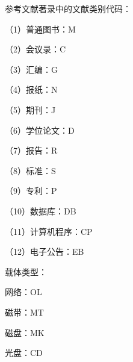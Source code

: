 \par
参考文献著录中的文献类别代码：
\par
（1）普通图书：M
\par
（2）会议录：C
\par
（3）汇编：G
\par
（4）报纸：N
\par
（5）期刊：J
\par
（6）学位论文：D
\par
（7）报告：R
\par
（8）标准：S
\par
（9）专利：P
\par
（10）数据库：DB
\par
（11）计算机程序：CP
\par
（12）电子公告：EB
\par
载体类型：
\par
网络：OL
\par
磁带：MT
\par
磁盘：MK
\par
光盘：CD